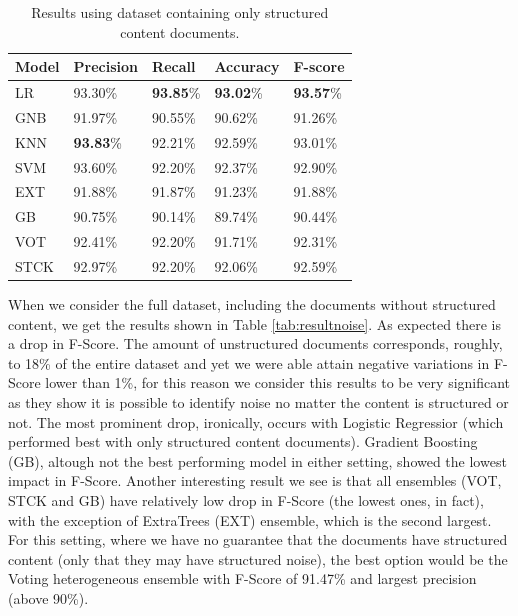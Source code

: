 \begin{table}[h]
\centering
\caption{Results using dataset containing only structured content documents.}
\label{tab:result}
\begin{tabular}{| l | l | l | l | l |}
\hline
Model & Precision & Recall & Accuracy & F-score \\ \hline
LR   & 93.30\% & \textbf{93.85}\% & \textbf{93.02}\% & \textbf{93.57}\% \\
GNB  & 91.97\% & 90.55\% & 90.62\% & 91.26\% \\
KNN  & \textbf{93.83}\% & 92.21\% & 92.59\% & 93.01\% \\
SVM  & 93.60\% & 92.20\% & 92.37\% & 92.90\% \\
EXT  & 91.88\% & 91.87\% & 91.23\% & 91.88\% \\
GB   & 90.75\% & 90.14\% & 89.74\% & 90.44\% \\
VOT  & 92.41\% & 92.20\% & 91.71\% & 92.31\% \\
STCK & 92.97\% & 92.20\% & 92.06\% & 92.59\% \\
\hline
\end{tabular}
\end{table}

When we consider the full dataset, including the documents without structured
content, we get the results shown in Table \ref{tab:resultnoise}. As expected
there is a drop in F-Score. The amount of unstructured documents corresponds,
roughly, to 18\% of the entire dataset and yet we were able attain negative
variations in F-Score lower than 1\%, for this reason we consider this results
to be very significant as they show it is possible to identify noise no matter
the content is structured or not. The most prominent drop, ironically, occurs
with Logistic Regressior (which performed best with only structured content
documents).
Gradient Boosting (GB), altough not the best performing model in either setting,
showed the lowest impact in F-Score. Another interesting result we see is that
all ensembles (VOT, STCK and GB) have relatively low drop in F-Score (the lowest
ones, in fact), with the exception of ExtraTrees (EXT) ensemble, which is the
second largest.
For this setting, where we have no guarantee that the documents have structured
content (only that they may have structured noise), the best option would be the
Voting heterogeneous ensemble with F-Score of 91.47\% and largest precision
(above 90\%).

